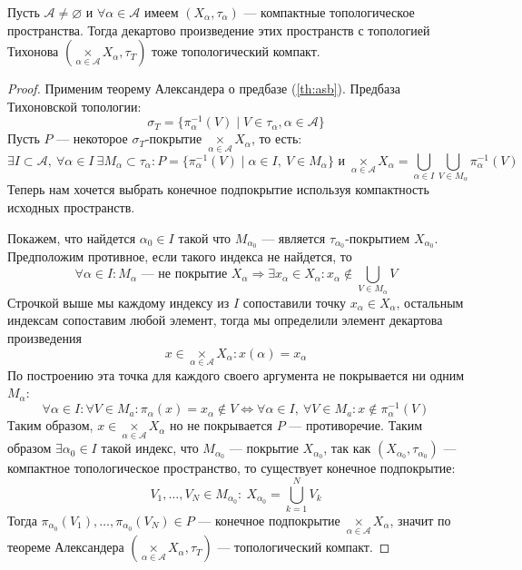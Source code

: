 \begin{theorem}
	Пусть $\mathscr{A} \neq \varnothing$ и $\forall \alpha \in \mathscr{A}$ имеем $(X_\alpha, \tau_\alpha)$ --- компактные топологическое пространства. Тогда декартово произведение этих пространств с топологией Тихонова $\left(\underset{\alpha \in \mathscr{A}}{\times} X_\alpha, \tau_T\right)$ тоже топологический компакт.
\end{theorem}
\begin{proof}
	Применим теорему Александера о предбазе (\ref{th:asb}). Предбаза Тихоновской топологии:
	$$
	\sigma_T = \{\pi_\alpha^{-1}(V) \mid V \in \tau_\alpha, \alpha \in \mathscr{A}\}
	$$
	Пусть $P$ --- некоторое $\sigma_T$-покрытие $\underset{\alpha \in \mathscr{A}}{\times} X_\alpha$, то есть:
	$$
	\exists I \subset \mathscr{A}, \ \forall \alpha \in I  \ \exists M_\alpha \subset \tau_\alpha : P = \{\pi_\alpha^{-1}(V) \mid \alpha \in I, \ V \in M_\alpha\} \text{ и } \underset{\alpha \in \mathscr{A}}{\times} X_\alpha = \bigcup_{\alpha \in I }\bigcup_{V \in M_\alpha} \pi_\alpha^{-1}(V)
	$$
	Теперь нам хочется выбрать конечное подпокрытие используя компактность исходных пространств. 
	
	Покажем, что найдется $\alpha_0 \in I$ такой что $M_{\alpha_0}$ --- является $\tau_{\alpha_0}$-покрытием $X_{\alpha_0}$. Предположим противное, если такого индекса не найдется, то 
	$$
	\forall  \alpha \in I: M_\alpha \text{ --- не покрытие $X_\alpha$} \Rightarrow \exists x_\alpha \in X_\alpha: x_\alpha \notin \bigcup_{V \in M_\alpha}V
	$$
	Строчкой выше мы каждому индексу из $I$ сопоставили точку $x_\alpha \in X_\alpha$, остальным индексам сопоставим любой элемент, тогда мы определили элемент декартова произведения 
	$$
	x \in \underset{\alpha \in \mathscr{A}}{\times} X_\alpha: x(\alpha) = x_\alpha
	$$
	По построению эта точка для каждого своего аргумента  не покрывается ни одним  $M_\alpha$:
	$$
	\forall \alpha \in I: \forall V \in M_a: \pi_\alpha(x) = x_\alpha \notin V \Leftrightarrow \forall \alpha \in I, \ \forall V \in M_a: x \notin \pi_\alpha^{-1}(V)
	$$
	Таким образом, $x \in \underset{\alpha \in \mathscr{A}}{\times} X_\alpha$ но не покрывается $P$ --- противоречие. Таким образом $\exists \alpha_0 \in I$ такой индекс, что $M_{\alpha_0}$ --- покрытие $X_{\alpha_0}$, так как $(X_{\alpha_0}, \tau_{\alpha_0})$ --- компактное топологическое пространство, то существует конечное подпокрытие: 
	$$
	V_1, \dots, V_N \in M_{\alpha_0}: \ X_{\alpha_0} = \bigcup_{k=1}^N V_k
	$$
	Тогда $\pi_{\alpha_0}(V_1), \dots, \pi_{\alpha_0}(V_N) \in P$ --- конечное подпокрытие  $\underset{\alpha \in \mathscr{A}}{\times} X_\alpha$, значит по теореме Александера $\left(\underset{\alpha \in \mathscr{A}}{\times} X_\alpha, \tau_T\right)$ --- топологический компакт.
\end{proof}